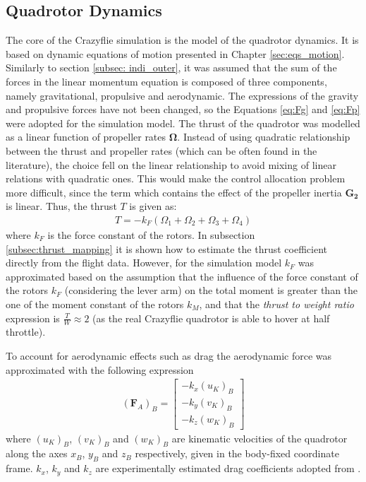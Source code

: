 \documentclass[11pt, a4paper, twoside]{report}
\begin{document}
\subsection{Quadrotor Dynamics} \label{subsec:quadrotor_dynamics}

The core of the Crazyflie simulation is the model of the quadrotor dynamics. It is based on dynamic equations of motion presented in Chapter \ref{sec:eqs_motion}. Similarly to section \ref{subsec: indi_outer}, it was assumed that the sum of the forces in the linear momentum equation is composed of three components, namely gravitational, propulsive and aerodynamic. The expressions of the gravity and propulsive forces have not been changed, so the Equations \ref{eq:Fg} and \ref{eq:Fp} were adopted for the simulation model. The thrust of the quadrotor was modelled as a linear function of propeller rates $\bm{\Omega}$. Instead of using quadratic relationship between the thrust and propeller rates (which can be often found in the literature), the choice fell on the linear relationship to avoid mixing of linear relations with quadratic ones. This would make the control allocation problem more difficult, since the term which contains the effect of the propeller inertia $\bm{G_2}$ is linear. Thus, the thrust $T$ is given as: 
\begin{equation}
	\begin{split}
		T = - k_F (\Omega_1 + \Omega_2 + \Omega_3 + \Omega_4)
		\label{eq:thrust}
	\end{split}
\end{equation}
where $k_F$ is the force constant of the rotors. In subsection \ref{subsec:thrust_mapping} it is shown how to estimate the thrust coefficient directly from the flight data. However, for the simulation model $k_F$ was approximated based on the assumption that the influence of the force constant of the rotors $k_F$ (considering the lever arm) on the total moment is greater than the one of the moment constant of the rotors $k_M$, and that the \textit{thrust to weight ratio} expression is $\frac{T}{W} \approx 2$ (as the real Crazyflie quadrotor is able to hover at half throttle).

To account for aerodynamic effects such as drag the aerodynamic force was approximated with the following expression 
\begin{equation}
	\begin{split}
		(\bm{F}_A)_B =  
		\begin{bmatrix}
			-k_x (u_K)_B\\
			-k_y (v_K)_B\\
			-k_z (w_K)_B
		\end{bmatrix}
		\label{eq:Fa_simulink}
	\end{split}
\end{equation}
where $(u_K)_B$, $(v_K)_B$ and $(w_K)_B$ are kinematic velocities of the quadrotor along the axes $x_B$, $y_B$ and $z_B$ respectively, given in the body-fixed coordinate frame. $k_x$, $k_y$ and $k_z$ are experimentally estimated drag coefficients adopted from \cite{foerster}.
\end{document}
